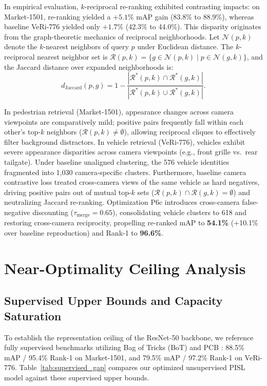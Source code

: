 In empirical evaluation, $k$-reciprocal re-ranking \cite{zhong2017reranking} exhibited contrasting impacts: on Market-1501, re-ranking yielded a $+5.1\%$ mAP gain (83.8\% to 88.9\%), whereas baseline VeRi-776 yielded only $+1.7\%$ (42.3\% to 44.0\%). This disparity originates from the graph-theoretic mechanics of reciprocal neighborhoods. Let $\mathcal{N}(p, k)$ denote the $k$-nearest neighbors of query $p$ under Euclidean distance. The $k$-reciprocal nearest neighbor set is $\mathcal{R}(p, k) = \{g \in \mathcal{N}(p, k) \mid p \in \mathcal{N}(g, k)\}$, and the Jaccard distance over expanded neighborhoods is:
\begin{equation}
    d_{\text{Jaccard}}(p, g) = 1 - \frac{|\mathcal{R}^*(p, k) \cap \mathcal{R}^*(g, k)|}{|\mathcal{R}^*(p, k) \cup \mathcal{R}^*(g, k)|}.
\end{equation}

In pedestrian retrieval (Market-1501), appearance changes across camera viewpoints are comparatively mild; positive pairs frequently fall within each other's top-$k$ neighbors ($\mathcal{R}(p, k) \neq \emptyset$), allowing reciprocal cliques to effectively filter background distractors. In vehicle retrieval (VeRi-776), vehicles exhibit severe appearance disparities across camera viewpoints (e.g., front grille vs.\ rear tailgate). Under baseline unaligned clustering, the 576 vehicle identities fragmented into 1,030 camera-specific clusters. Furthermore, baseline camera contrastive loss treated cross-camera views of the same vehicle as hard negatives, driving positive pairs out of mutual top-$k$ sets ($\mathcal{R}(p, k) \cap \mathcal{R}(g, k) = \emptyset$) and neutralizing Jaccard re-ranking. Optimization P6c introduces cross-camera false-negative discounting ($\tau_{\text{merge}} = 0.65$), consolidating vehicle clusters to 618 and restoring cross-camera reciprocity, propelling re-ranked mAP to \textbf{54.1\%} (+10.1\% over baseline reproduction) and Rank-1 to \textbf{96.6\%}.

\section{Near-Optimality Ceiling Analysis}
\label{sec:ceiling_analysis}

\subsection{Supervised Upper Bounds and Capacity Saturation}

To establish the representation ceiling of the ResNet-50 backbone, we reference fully supervised benchmarks utilizing Bag of Tricks (BoT) \cite{lin2019bot} and PCB \cite{sun2018beyond}: 88.5\% mAP / 95.4\% Rank-1 on Market-1501, and 79.5\% mAP / 97.2\% Rank-1 on VeRi-776. Table~\ref{tab:supervised_gap} compares our optimized unsupervised PISL model against these supervised upper bounds.

